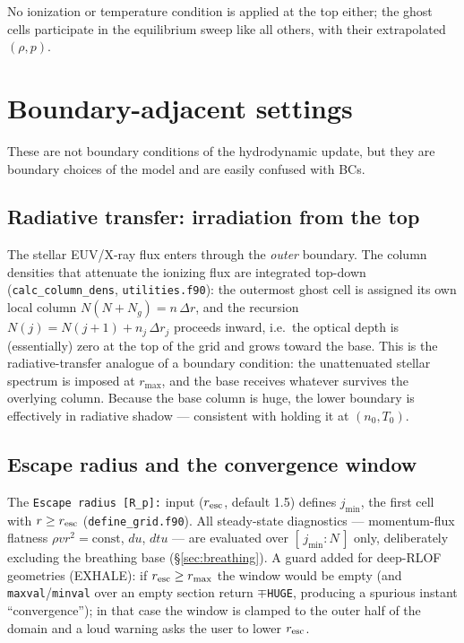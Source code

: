 \documentclass[english,a4paper]{kiseon_memo}
\begin{document}
No ionization or temperature condition is applied at the top either;
the ghost cells participate in the equilibrium sweep like all others,
with their extrapolated $(\rho, p)$.

\section{Boundary-adjacent settings}
\label{sec:adjacent}

These are not boundary conditions of the hydrodynamic update, but they
are boundary choices of the model and are easily confused with BCs.

\subsection{Radiative transfer: irradiation from the top}

The stellar EUV/X-ray flux enters through the \emph{outer} boundary.
The column densities that attenuate the ionizing flux are integrated
top-down (\texttt{calc\_column\_dens}, \texttt{utilities.f90}): the
outermost ghost cell is assigned its own local column
$N(N{+}N_g) = n\,\Delta r$, and the recursion
$N(j) = N(j{+}1) + n_j\,\Delta r_j$ proceeds inward, i.e.\ the optical
depth is (essentially) zero at the top of the grid and grows toward
the base. This is the radiative-transfer analogue of a boundary
condition: the unattenuated stellar spectrum is imposed at $r_{\max}$,
and the base receives whatever survives the overlying column. Because
the base column is huge, the lower boundary is effectively in
radiative shadow --- consistent with holding it at $(n_0, T_0)$.

\subsection{Escape radius and the convergence window}
\label{sec:resc}

The \texttt{Escape radius [R\_p]:} input ($r_{\rm esc}$, default 1.5)
defines $j_{\min}$, the first cell with $r \ge r_{\rm esc}$
(\texttt{define\_grid.f90}). All steady-state diagnostics ---
momentum-flux flatness $\rho v r^2 = \mathrm{const}$, $du$, $dtu$ ---
are evaluated over $[\,j_{\min} : N\,]$ only, deliberately excluding
the breathing base (\S\ref{sec:breathing}). A guard added for deep-RLOF
geometries (EXHALE): if $r_{\rm esc} \ge r_{\max}$ the window would be
empty (and \texttt{maxval}/\texttt{minval} over an empty section
return $\mp$\texttt{HUGE}, producing a spurious instant
``convergence''); in that case the window is clamped to the outer half
of the domain and a loud warning asks the user to lower
$r_{\rm esc}$.
\end{document}
